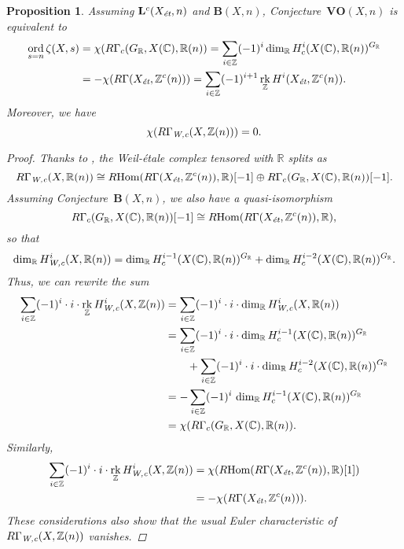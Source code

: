 \documentclass[10pt,a4paper,oneside,draft]{article}
\DeclareMathOperator{\Hom}{Hom}
\DeclareMathOperator{\ord}{ord}
\DeclareMathOperator{\rk}{rk}
\newcommand{\CC}{\mathbb{C}}
\newcommand{\RR}{\mathbb{R}}
\newcommand{\ZZ}{\mathbb{Z}}
\newcommand{\et}{\text{\it \'{e}t}}
\newcommand{\Wc}{\text{\it W,c}}
\newcommand{\RHom}{R\!\Hom}
\theoremstyle{myplain}
\newtheorem{proposition}[theorem]{Proposition}
\theoremstyle{mydefinition}
\numberwithin{equation}{section}
\begin{document}
\begin{proposition}
  \label{prop:VO(X,n)-assuming-B(X,n)}
  Assuming $\mathbf{L}^c (X_\et, n)$ and $\mathbf{B} (X,n)$,
  Conjecture~$\mathbf{VO} (X,n)$ is equivalent to
  \begin{align*}
    \ord_{s=n} \zeta (X,s) & = \chi (R\Gamma_c (G_\RR, X(\CC), \RR (n))
    = \sum_{i \in \ZZ} (-1)^i \dim_\RR H^i_c (X(\CC), \RR (n))^{G_\RR} \\
                           & = -\chi (R\Gamma (X_\et, \ZZ^c (n)))
    = \sum_{i \in \ZZ} (-1)^{i+1} \rk_\ZZ H^i (X_\et, \ZZ^c (n)).
  \end{align*}
  Moreover, we have
  $$\chi (R\Gamma_\Wc (X, \ZZ(n))) = 0.$$

  \begin{proof}
    Thanks to \cite[Proposition~7.13]{Beshenov-Weil-etale-1}, the Weil-\'{e}tale
    complex tensored with $\RR$ splits as
    \[ R\Gamma_\Wc (X,\RR (n)) \cong
      \RHom (R\Gamma (X_\et, \ZZ^c (n)), \RR) [-1] \oplus
      R\Gamma_c (G_\RR, X (\CC), \RR (n)) [-1]. \]
    Assuming Conjecture~$\mathbf{B} (X,n)$, we also have a quasi-isomorphism
    \[ R\Gamma_c (G_\RR, X (\CC), \RR (n)) [-1] \cong
      \RHom (R\Gamma (X_\et, \ZZ^c (n)), \RR), \]
    so that
    \[ \dim_\RR H^i_\Wc (X,\RR(n)) =
      \dim_\RR H^{i-1}_c (X (\CC), \RR (n))^{G_\RR} +
      \dim_\RR H^{i-2}_c (X (\CC), \RR (n))^{G_\RR}. \]
    Thus, we can rewrite the sum
    \begin{align*}
      \sum_{i \in \ZZ} (-1)^i \cdot i \cdot \rk_\ZZ H^i_\Wc (X, \ZZ (n)) & = \sum_{i \in \ZZ} (-1)^i \cdot i \cdot \dim_\RR H^i_\Wc (X, \RR (n)) \\
                                                                         & = \sum_{i \in \ZZ} (-1)^i \cdot i \cdot
                                                                           \dim_\RR H^{i-1}_c (X (\CC), \RR (n))^{G_\RR} \\
      & \quad\quad + \sum_{i \in \ZZ} (-1)^i \cdot i \cdot \dim_\RR H^{i-2}_c (X (\CC), \RR (n))^{G_\RR} \\
                                                                         & = -\sum_{i \in \ZZ} (-1)^i \, \dim_\RR H^{i-1}_c (X (\CC), \RR (n))^{G_\RR} \\
                                                                         & = \chi (R\Gamma_c (G_\RR, X (\CC), \RR (n)).
    \end{align*}
    Similarly,
    \begin{align*}
      \sum_{i \in \ZZ} (-1)^i \cdot i \cdot \rk_\ZZ H^i_\Wc (X, \ZZ (n)) & = \chi (\RHom (R\Gamma (X_\et, \ZZ^c (n)), \RR) [1]) \\
                                                                         & = -\chi (R\Gamma (X_\et, \ZZ^c (n))).
    \end{align*}
    These considerations also show that the usual Euler characteristic of
    $R\Gamma_\Wc (X, \ZZ(n))$ vanishes.
  \end{proof}
\end{proposition}
\end{document}
